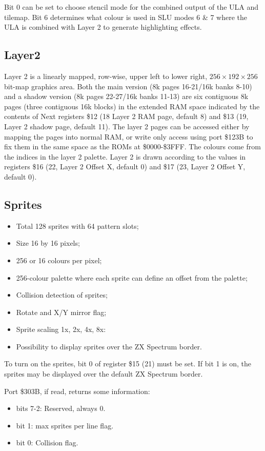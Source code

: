 Bit 0 can be set to choose stencil mode for the combined output of the
ULA and tilemap.  Bit 6 determines what colour is used in SLU modes 6
\& 7 where the ULA is combined with Layer 2 to generate highlighting
effects.

\subsection{Layer2}
Layer 2 is a linearly mapped, row-wise, upper left to lower right,
$256\times192\times256$ bit-map graphics area.  Both the main version
(8k pages 16-21/16k banks 8-10) and a shadow version (8k pages
22-27/16k banks 11-13) are six contiguous 8k pages (three contiguous
16k blocks) in the extended RAM space indicated by the contents of
Next registers \$12 (18 Layer 2 RAM page, default 8) and \$13 (19,
Layer 2 shadow page, default 11).  The layer 2 pages can be accessed
either by mapping the pages into normal RAM, or write only access
using port \$123B to fix them in the same space as the ROMs at
\$0000-\$3FFF.  The colours come from the indices in the layer 2
palette.  Layer 2 is drawn according to the values in registers \$16
(22, Layer 2 Offset X, default 0) and \$17 (23, Layer 2 Offset Y,
default 0).

\subsection{Sprites}
\begin{itemize}
\item Total 128 sprites with 64 pattern slots;
\item Size 16 by 16 pixels;
\item 256 or 16 colours per pixel;
\item 256-colour palette where each sprite can define an offset from
  the palette;
\item Collision detection of sprites;
\item Rotate and X/Y mirror flag;
\item Sprite scaling 1x, 2x, 4x, 8x:
\item Possibility to display sprites over the ZX Spectrum border.
\end{itemize}
To turn on the sprites, bit 0 of register \$15 (21) must be set. If
bit 1 is on, the sprites may be displayed over the default ZX Spectrum
border.

Port \$303B, if read, returns some information:
\begin{itemize}
\item bits 7-2: Reserved, always 0.
\item bit 1: max sprites per line flag.
\item bit 0: Collision flag.
\end{itemize}

